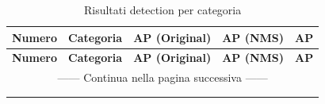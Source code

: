 \newpage
\begin{center}
\begin{longtable}{|c|l|c|c|c|}

\hline \multicolumn{1}{|c|}{\textbf{Numero}} &
\multicolumn{1}{c|}{\textbf{Categoria}} & \multicolumn{1}{c|}{\textbf{AP (Original)}} &\multicolumn{1}{c|}{\textbf{AP (NMS)}} &\multicolumn{1}{c|}{\textbf{AP}} \\ \hline\endfirsthead

\hline \multicolumn{1}{|c|}{\textbf{Numero}} &
\multicolumn{1}{c|}{\textbf{Categoria}} &\multicolumn{1}{c|}{\textbf{AP (Original)}} &\multicolumn{1}{c|}{\textbf{AP (NMS)}} &\multicolumn{1}{c|}{\textbf{AP}}\\ \hline \endhead

\hline \multicolumn{5}{|c|}{{------ Continua nella pagina successiva ------}} \\ \hline
\endfoot

\hline

\caption{Risultati detection per categoria}
\label{risultati detection per categoria} \\

\endlastfoot



\end{longtable}
\end{center}
